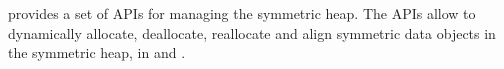 \openshmem provides a set of \ac{API}s for managing the symmetric heap. The \ac{API}s allow to dynamically allocate, deallocate, reallocate and align symmetric data objects in the symmetric heap, in \Clang{} and \Fortran.